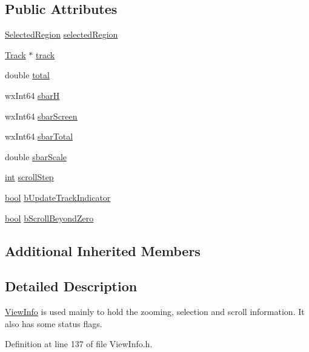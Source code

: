 \subsection*{Public Attributes}
\begin{DoxyCompactItemize}
\item 
\hyperlink{class_selected_region}{Selected\+Region} \hyperlink{class_view_info_a07895f02c517d048cc1ca855b0efa54e}{selected\+Region}
\item 
\hyperlink{class_track}{Track} $\ast$ \hyperlink{class_view_info_a3f883252ed37f0863113e0e20afc70e2}{track}
\item 
double \hyperlink{class_view_info_a7183cfda6c309fdba18c625cce4378b7}{total}
\item 
wx\+Int64 \hyperlink{class_view_info_a9c7d7713ca391730718f032a0aabcdb7}{sbarH}
\item 
wx\+Int64 \hyperlink{class_view_info_a869d52a5605fbb274c89239ee1b966a6}{sbar\+Screen}
\item 
wx\+Int64 \hyperlink{class_view_info_a4d4f7bcd9cca14e25a2d9fb90f768b53}{sbar\+Total}
\item 
double \hyperlink{class_view_info_aa7eac35c75a03b3c37b8ec89b736a7a8}{sbar\+Scale}
\item 
\hyperlink{xmltok_8h_a5a0d4a5641ce434f1d23533f2b2e6653}{int} \hyperlink{class_view_info_aee3714d955a107a54458e99fa7234a93}{scroll\+Step}
\item 
\hyperlink{mac_2config_2i386_2lib-src_2libsoxr_2soxr-config_8h_abb452686968e48b67397da5f97445f5b}{bool} \hyperlink{class_view_info_a32de00c7e8d82498b5f34b792fb51b94}{b\+Update\+Track\+Indicator}
\item 
\hyperlink{mac_2config_2i386_2lib-src_2libsoxr_2soxr-config_8h_abb452686968e48b67397da5f97445f5b}{bool} \hyperlink{class_view_info_ac7f681a6d3bdd4450edb5d50b42160a9}{b\+Scroll\+Beyond\+Zero}
\end{DoxyCompactItemize}
\subsection*{Additional Inherited Members}


\subsection{Detailed Description}
\hyperlink{class_view_info}{View\+Info} is used mainly to hold the zooming, selection and scroll information. It also has some status flags. 

Definition at line 137 of file View\+Info.\+h.



